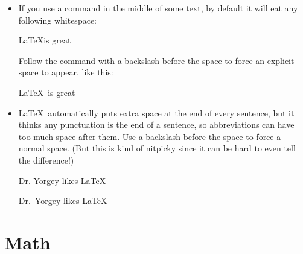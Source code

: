 \documentclass{article}
\begin{document}
\begin{itemize}
\item If you use a command in the middle of some text, by default it
  will eat any following whitespace:
\begin{bad}
\LaTeX is great
\end{bad}
  Follow the command with a backslash before the space to force an
  explicit space to appear, like this:
\begin{good}
\LaTeX\ is great
\end{good}
\item \LaTeX\ automatically puts extra space at the end of every
  sentence, but it thinks any punctuation is the end of a sentence, so
  abbreviations can have too much space after them.  Use a backslash
  before the space to force a normal space.  (But this is kind of nitpicky
  since it can be hard to even tell the difference!)
\begin{bad}
Dr. Yorgey likes \LaTeX
\end{bad}
\begin{good}
Dr.\ Yorgey likes \LaTeX
\end{good}

\end{itemize}

\section*{Math}
\label{sec:math}
\end{document}
